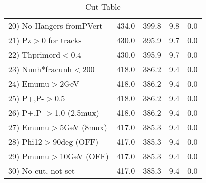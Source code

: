 \begin{table}[h!]
\begin{tabular}{||l||r|r|r|r||}
 20) No Hangers fromPVert &       434.0 &       399.8 &         9.8 &         0.0 \\
 21) Pz$>$0 for tracks    &       430.0 &       395.9 &         9.7 &         0.0 \\
 22) Thprimord$<$0.4      &       430.0 &       395.9 &         9.7 &         0.0 \\
 23) Nunh*fracunh$<$200   &       418.0 &       386.2 &         9.4 &         0.0 \\
 24) Emumu$>$2GeV         &       418.0 &       386.2 &         9.4 &         0.0 \\
 25) P+,P-$>$0.5          &       418.0 &       386.2 &         9.4 &         0.0 \\
 26) P+,P-$>$1.0 (2.5mux) &       418.0 &       386.2 &         9.4 &         0.0 \\
 27) Emumu$>$5GeV  (8mux) &       417.0 &       385.3 &         9.4 &         0.0 \\
 28) Phi12$>$90deg  (OFF) &       417.0 &       385.3 &         9.4 &         0.0 \\
 29) Pmumu$>$10GeV  (OFF) &       417.0 &       385.3 &         9.4 &         0.0 \\
 30) No cut, not set      &       417.0 &       385.3 &         9.4 &         0.0 \\
 \hline
 \hline
 \end{tabular}
 \caption{Cut Table \cohpip }
 \label{tab-cut_copip}
 \end{table}
